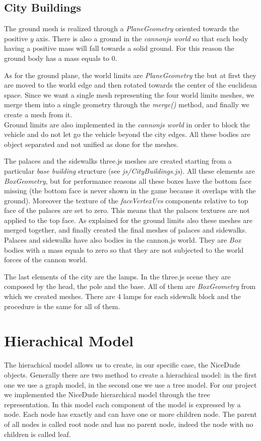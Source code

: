 \documentclass[a4paper, 11pt, titlepage]{report}
\begin{document}
	\section{City Buildings}
		\par The ground mesh is realized through a \emph{PlaneGeometry} oriented towards the positive $y$ axis. There is also a ground in the \emph{cannonjs world} so that each body having a positive mass will fall towards a solid ground. For this reason the ground body has a mass equals to $0$.
		\par As for the ground plane, the world limits are \emph{PlaneGeometry} the but at first they are moved to the world edge and then rotated towards the center of the euclidean space. Since we want a single mesh representing the four world limits meshes, we merge them into a single geometry through the \emph{merge()} method, and finally we create a mesh from it. \\
		Ground limits are also implemented in the \emph{cannonjs world} in order to block the vehicle and do not let go the vehicle beyond the city edges. All these bodies are object separated and not unified as done for the meshes.
		\par The palaces and the sidewalks three.js meshes are created starting from a particular \emph{base building} structure (see \emph{js/CityBuildings.js}). All these elements are \emph{BoxGeometry}, but for performance reasons all these boxes have the bottom face missing (the bottom face is never shown in the game because it overlaps with the ground). Moreover the texture of the \emph{faceVertexUvs} components relative to top face of the palaces are set to zero. This means that the palaces textures are not applied to the top face. As explained for the ground limits also these meshes are merged together, and finally created the final meshes of palaces and sidewalks.\\
		Palaces and sidewalks have also bodies in the cannon.js world. They are \emph{Box} bodies 
		with a mass equals to zero so that they are not subjected to the world forces of the cannon world.
		\par The last elements of the city are the lamps. In the three.js scene they are composed by the head, the pole and the base. All of them are \emph{BoxGeometry} from which we created meshes. There are 4 lamps for each sidewalk block and the procedure is the same for all of them.

\chapter{Hierachical Model}
	\par The hierachical model allows us to create, in our specific case, the NiceDude objects. Generally there are two method to create a hierachical model: in the first one we use a graph model, in the second one we use a tree model.
	For our project we implemented the NiceDude hierarchical model through the tree representation. In this model each component of the model is expressed by a node. Each node has exactly and can have one or more children node. The parent of all nodes is called root node and has no parent node, indeed the node with no children is called leaf.
 
\end{document}
